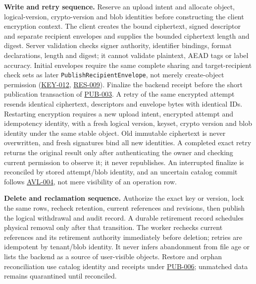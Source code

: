 \documentclass[11pt,a4paper]{article}
\newcommand{\code}[1]{{\small\nolinkurl{#1}}}
\newcommand{\rr}[1]{\hyperlink{req:#1}{#1}}
\begin{document}
\textbf{Write and retry sequence.} Reserve an upload intent and allocate object, logical-version, crypto-version and blob identities before constructing the client encryption context. The client creates the bound ciphertext, signed descriptor and separate recipient envelopes and supplies the bounded ciphertext length and digest. Server validation checks signer authority, identifier bindings, format declarations, length and digest; it cannot validate plaintext, AEAD tags or label accuracy. Initial envelopes require the same complete sharing and target-recipient check sets as later \code{PublishRecipientEnvelope}, not merely create-object permission (\rr{KEY-012}, \rr{RES-009}). Finalize the backend receipt before the short publication transaction of \rr{PUB-003}. A retry of the same encrypted attempt resends identical ciphertext, descriptors and envelope bytes with identical IDs. Restarting encryption requires a new upload intent, encrypted attempt and idempotency identity, with a fresh logical version, keyset, crypto version and blob identity under the same stable object. Old immutable ciphertext is never overwritten, and fresh signatures bind all new identities. A completed exact retry returns the original result only after authenticating the owner and checking current permission to observe it; it never republishes. An interrupted finalize is reconciled by stored attempt/blob identity, and an uncertain catalog commit follows \rr{AVL-004}, not mere visibility of an operation row.

\textbf{Delete and reclamation sequence.} Authorize the exact key or version, lock the same rows, recheck retention, current references and revisions, then publish the logical withdrawal and audit record. A durable retirement record schedules physical removal only after that transition. The worker rechecks current references and its retirement authority immediately before deletion; retries are idempotent by tenant/blob identity. It never infers abandonment from file age or lists the backend as a source of user-visible objects. Restore and orphan reconciliation use catalog identity and receipts under \rr{PUB-006}; unmatched data remains quarantined until reconciled.
\end{document}

